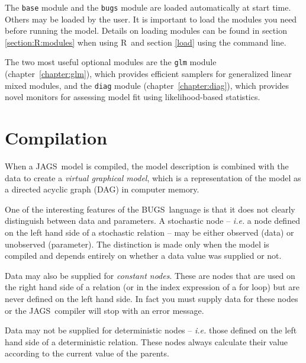 \documentclass[11pt, a4paper, titlepage]{report}
\newcommand{\JAGS}{\textsf{JAGS}}
\newcommand{\BUGS}{\textsf{BUGS}}
\newcommand{\R}{\textsf{R}}
\begin{document}
The \texttt{base} module and the \texttt{bugs} module are loaded
automatically at start time.  Others may be loaded by the user. It is
important to load the modules you need {\rm before} running the model.
Details on loading modules can be found in section \ref{section:R:modules}
when using \R\ and section \ref{load} using the command line.

The two most useful optional modules are the \texttt{glm} module
(chapter~\ref{chapter:glm}), which provides efficient samplers for
generalized linear mixed modules, and the \texttt{diag} module
(chapter~\ref{chapter:diag}), which provides novel monitors for
assessing model fit using likelihood-based statistics.

\section{Compilation}

When a \JAGS\ model is compiled, the model description is combined
with the data to create a {\em virtual graphical model}, which is a
representation of the model as a directed acyclic graph (DAG) in
computer memory.%

One of the interesting features of the \BUGS\ language is that it does
not clearly distinguish between data and parameters.  A stochastic
node -- {\em i.e.} a node defined on the left hand side of a
stochastic relation -- may be either observed (data) or unobserved
(parameter). The distinction is made only when the model is compiled
and depends entirely on whether a data value was supplied or not.

Data may also be supplied for {\em constant nodes}. These are nodes
that are used on the right hand side of a relation (or in the index
expression of a for loop) but are never defined on the left hand
side. In fact you must supply data for these nodes or the
\JAGS\ compiler will stop with an error message.

Data may not be supplied for deterministic nodes -- {\em i.e.} those
defined on the left hand side of a deterministic relation. These nodes
always calculate their value according to the current value of the
parents. 
\end{document}
